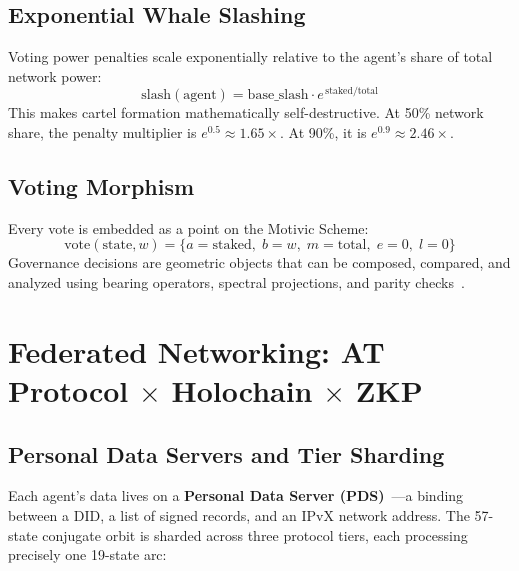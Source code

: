 \documentclass[12pt,a4paper]{article}
\begin{document}
\subsection{Exponential Whale Slashing}

Voting power penalties scale exponentially relative to the agent's share of total network power:
\begin{equation}
\mathrm{slash}(\mathrm{agent}) = \mathrm{base\_slash} \cdot e^{\,\mathrm{staked} / \mathrm{total}}
\end{equation}
This makes cartel formation mathematically self-destructive. At 50\% network share, the penalty multiplier is $e^{0.5} \approx 1.65\times$. At 90\%, it is $e^{0.9} \approx 2.46\times$.

\subsection{Voting Morphism}

Every vote is embedded as a point on the Motivic Scheme:
\begin{equation}
\mathrm{vote}(\mathrm{state}, w) = \{a = \mathrm{staked},\; b = w,\; m = \mathrm{total},\; e = 0,\; l = 0\}
\end{equation}
Governance decisions are geometric objects that can be composed, compared, and analyzed using bearing operators, spectral projections, and parity checks~\cite{PP-I-Ch15}.

\section{Federated Networking: AT Protocol $\times$ Holochain $\times$ ZKP}
\label{sec:networking}

\subsection{Personal Data Servers and Tier Sharding}

Each agent's data lives on a \textbf{Personal Data Server (PDS)}~\cite{atproto2024}---a binding between a DID, a list of signed records, and an IPvX network address. The 57-state conjugate orbit is sharded across three protocol tiers, each processing precisely one 19-state arc:
\end{document}
